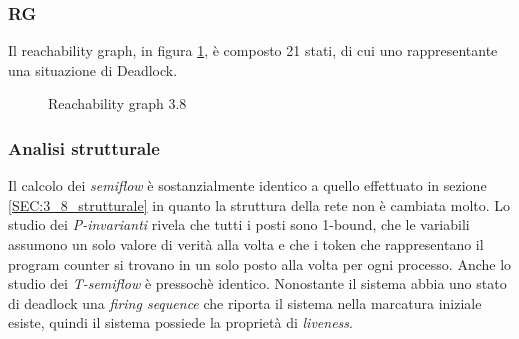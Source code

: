 \documentclass[a4paper]{article}
\begin{document}
\subsubsection{RG}
Il reachability graph, in figura \ref{FIG:3.8RG}, è composto 21 stati, di cui uno rappresentante una situazione di Deadlock.
\begin{figure}[!ht]
\centering
{}
\caption{Reachability graph 3.8} \label{FIG:3.8RG}
\end{figure}
\newpage
\subsubsection{Analisi strutturale}
Il calcolo dei \textit{semiflow} è sostanzialmente identico a quello effettuato in sezione \ref{SEC:3_8_strutturale} in quanto la struttura della rete non è cambiata molto.
Lo studio dei \textit{P-invarianti} rivela che tutti i posti sono 1-bound, che le variabili assumono un solo valore di verità alla volta e che i token che rappresentano il program counter si trovano in un solo posto alla volta per ogni processo.
Anche lo studio dei \textit{T-semiflow} è pressochè identico.
Nonostante il sistema abbia uno stato di deadlock una \textit{firing sequence} che riporta il sistema nella marcatura iniziale esiste, quindi il sistema possiede la proprietà di \textit{liveness}.\\
\end{document}
